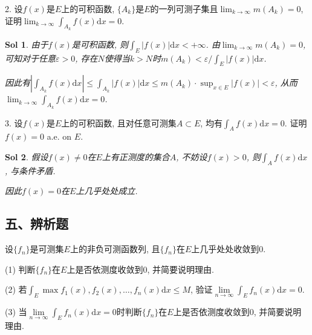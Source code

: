 \documentclass[UTF8]{article}
\newtheorem{solution}{Sol}
\begin{document}
  2. 设$f(x)$是$E$上的可积函数, $\{A_k\}$是$E$的一列可测子集且$\lim_{k \to \infty}m(A_k)=0$, 证明$\lim_{k \to \infty}\int_{A_k}f(x)\mathrm{d}x=0$.\par
    
  \begin{solution}
    由于$f(x)$是可积函数, 则$\int_{E}|f(x)|\mathrm{d}x<+\infty$. 由$\lim_{k \to \infty}m(A_k)=0$, 可知对于任意$\varepsilon >0$, 存在$N$使得当$k>N$时$m(A_k)<\varepsilon/\int_{E}|f(x)|\mathrm{d}x$.\par
    因此有$\left|\int_{A_k}f(x)\mathrm{d}x\right|\leqslant \int_{A_k}|f(x)|\mathrm{d}x\leqslant m(A_k)\cdot \sup_{x\in E}|f(x)|<\varepsilon$, 从而$\lim_{k \to \infty}\int_{A_k}f(x)\mathrm{d}x=0$.\par
  \end{solution}

  3. 设$f(x)$是$E$上的可积函数, 且对任意可测集$A\subset E$, 均有$\int_{A}f(x)\mathrm{d}x=0$. 证明$f(x)=0$ a.e. on $E$.\par

  \begin{solution}
    假设$f(x)\neq 0$在$E$上有正测度的集合$A$, 不妨设$f(x)>0$, 则$\int_{A}f(x)\mathrm{d}x$, 与条件矛盾.\par
    因此$f(x)=0$在$E$上几乎处处成立.\par
  \end{solution}

  \subsection*{五、辨析题}

  设$\{f_n\}$是可测集$E$上的非负可测函数列, 且$\{f_n\}$在$E$上几乎处处收敛到$0$.\par
  (1) 判断$\{f_n\}$在$E$上是否依测度收敛到$0$, 并简要说明理由.\par
  (2) 若$\int_{E} \max{f_1(x),f_2(x),\ldots,f_n(x)}\mathrm{d}x\leqslant M$, 验证$\lim \limits_{n \to \infty}\int_{E}f_n(x)\mathrm{d}x=0$.\par
  (3) 当$\lim \limits_{n \to \infty}\int_{E}f_n(x)\mathrm{d}x=0$时判断$\{f_n\}$在$E$上是否依测度收敛到$0$, 并简要说明理由.\par
\end{document}

